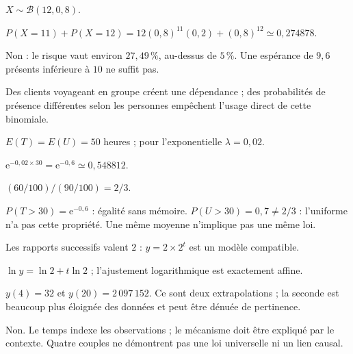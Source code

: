 \par\addvspace{6mm}\label{projet-cor-7}
\begin{questions}
\item $X\sim\mathcal B(12,0{,}8)$.
\item $P(X=11)+P(X=12)=12(0{,}8)^{11}(0{,}2)+(0{,}8)^{12}\simeq0{,}274878$.
\item Non : le risque vaut environ $27{,}49\,\%$, au-dessus de $5\,\%$. Une espérance de $9{,}6$ présents inférieure à $10$ ne suffit pas.
\item Des clients voyageant en groupe créent une dépendance ; des probabilités de présence différentes selon les personnes empêchent l’usage direct de cette binomiale.
\end{questions}
\par\addvspace{6mm}\label{projet-cor-8}
\begin{questions}
\item $E(T)=E(U)=50$ heures ; pour l’exponentielle $\lambda=0{,}02$.
\item $\mathrm e^{-0{,}02\times30}=\mathrm e^{-0{,}6}\simeq0{,}548812$.
\item $(60/100)/(90/100)=2/3$.
\item $P(T>30)=\mathrm e^{-0{,}6}$ : égalité sans mémoire. $P(U>30)=0{,}7\ne2/3$ : l’uniforme n’a pas cette propriété. Une même moyenne n’implique pas une même loi.
\end{questions}
\par\addvspace{6mm}\label{projet-cor-9}
\begin{questions}
\item Les rapports successifs valent $2$ : $y=2\times2^t$ est un modèle compatible.
\item $\ln y=\ln2+t\ln2$ ; l’ajustement logarithmique est exactement affine.
\item $y(4)=32$ et $y(20)=2\,097\,152$. Ce sont deux extrapolations ; la seconde est beaucoup plus éloignée des données et peut être dénuée de pertinence.
\item Non. Le temps indexe les observations ; le mécanisme doit être expliqué par le contexte. Quatre couples ne démontrent pas une loi universelle ni un lien causal.
\end{questions}
